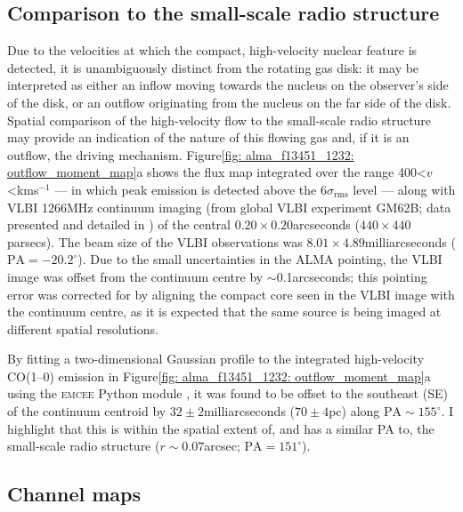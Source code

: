 \subsection{Comparison to the small-scale radio structure}
\label{section: alma_f13451_1232: analysis_and_results: radio_structure}

Due to the velocities at which the compact, high-velocity nuclear feature is detected, it is unambiguously distinct from the rotating gas disk: it may be interpreted as either an inflow moving towards the nucleus on the observer's side of the disk, or an outflow originating from the nucleus on the far side of the disk. Spatial comparison of the high-velocity flow to the small-scale radio structure may provide an indication of the nature of this flowing gas and, if it is an outflow, the driving mechanism. Figure\;\ref{fig: alma_f13451_1232: outflow_moment_map}a shows the flux map integrated over the range 400\;\textless\;$v$\;\textless{}\;km\;s$^{-1}$ --- in which peak emission is detected above the 6$\sigma_\mathrm{rms}$ level --- along with VLBI 1266\;MHz continuum imaging (from global VLBI experiment GM62B; data presented and detailed in \citealt{Morganti2013_4c1250}) of the central $0.20\times0.20$\;arcseconds ($440\times440$\;parsecs). The beam size of the VLBI observations was $8.01\times4.89$\;milliarcseconds ($\mathrm{PA}=-20.2^\circ$). Due to the small uncertainties in the ALMA pointing, the VLBI image was offset from the continuum centre by $\sim$0.1\;arcseconds; this pointing error was corrected for by aligning the compact core seen in the VLBI image with the continuum centre, as it is expected that the same source is being imaged at different spatial resolutions. 

By fitting a two-dimensional Gaussian profile to the integrated high-velocity CO(1--0) emission in Figure\;\ref{fig: alma_f13451_1232: outflow_moment_map}a using the \textsc{emcee} Python module \citep{FormanMackey2013}, it was found to be offset to the southeast (SE) of the continuum centroid by $32\pm2$\;milliarcseconds ($70\pm4$\;pc) along $\mathrm{PA}\sim155^{\circ}$. I highlight that this is within the spatial extent of, and has a similar PA to, the small-scale radio structure ($r\sim0.07$\;arcsec; $\mathrm{PA}=151^\circ$).


\subsection{Channel maps}
\label{section: alma_f13451_1232: analysis_and_results: channel_maps}

